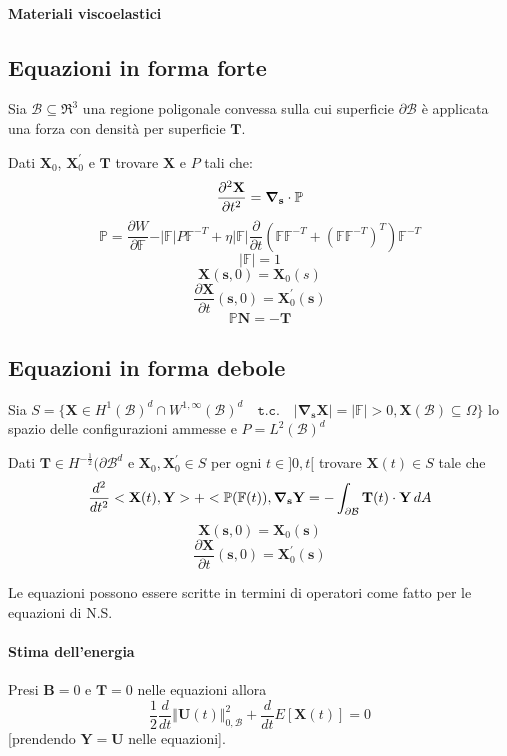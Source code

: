 \paragraph{Materiali viscoelastici}

\subsection{Equazioni in forma forte}

Sia $\mathcal{B} \subseteq \Re^3$ una regione poligonale convessa sulla cui superficie $\partial\mathcal{B}$ è applicata una forza con densità per superficie $\mathbf{T}$.

Dati $\mathbf{X}_0$, $\mathbf{X}^{'}_0$ e $\mathbf{T}$ trovare $\mathbf{X}$ e $P$ tali che:
$$\frac{\partial^2\mathbf{X}}{\partial t^2} = \boldsymbol{\nabla}_\mathbf{s} \cdot \mathbb{P}$$
$$\mathbb{P} = \frac{\partial W}{\partial\mathbb{F}} - \vert\mathbb{F}\vert P\mathbb{F}^{-T} + \eta\vert\mathbb{F}\vert \frac{\partial}{\partial t}(\mathbb{F}\mathbb{F}^{-T} + (\mathbb{F}\mathbb{F}^{-T})^T)\mathbb{F}^{-T}$$
$$\vert\mathbb{F}\vert=1$$
$$\mathbf{X}(\mathbf{s},0)=\mathbf{X}_0(s)$$
$$\frac{\partial \mathbf{X}}{\partial t}(\mathbf{s},0)=\mathbf{X}^{'}_0(\mathbf{s})$$
$$\mathbb{P}\mathbf{N}=-\mathbf{T}$$

\subsection{Equazioni in forma debole}

Sia $S = \{ \mathbf{X} \in H^1(\mathcal{B})^d \cap W^{1,\infty}(\mathcal{B})^d \quad \texttt{t.c.} \quad \vert \boldsymbol {\nabla}_{\mathbf{s}}\mathbf{X}\vert = \vert \mathbb{F} \vert > 0, \mathbf{X}(\mathcal{B}) \subseteq \Omega \}$ lo spazio delle configurazioni ammesse e $P = L^2(\mathcal{B})^d$

Dati $\mathbf{T} \in H^{-\frac{1}{2}}(\partial\mathcal{B}^d$ e $\mathbf{X}_0,\mathbf{X}^{'}_0 \in S$ per ogni $t \in ]0,t[$ trovare $\mathbf{X}(t) \in S$ tale che 
$$\frac{d^2}{dt^2} < \mathbf{X}(t), \mathbf{Y} > + < \mathbb{P}(\mathbb{F}(t)), \boldsymbol{\nabla}_\mathbf{s} \mathbf{Y} = -\int_{\partial\mathcal{B}}\mathbf{T}(t)\cdot\mathbf{Y}\,dA$$
$$\mathbf{X}(\mathbf{s},0)=\mathbf{X}_0(\mathbf{s})$$
$$\frac{\partial\mathbf{X}}{\partial t}(\mathbf{s},0)=\mathbf{X}^{'}_0(\mathbf{s})$$

Le equazioni possono essere scritte in termini di operatori come fatto per le equazioni di N.S.

\paragraph{Stima dell'energia}

Presi $\mathbf{B}=0$ e $\mathbf{T}=0$ nelle equazioni allora
$$\frac{1}{2}\frac{d}{dt}\Vert\mathbf{U}(t)\Vert^2_{0,\mathcal{B}}+\frac{d}{dt}E[\mathbf{X}(t)]=0$$
[prendendo $\mathbf{Y}=\mathbf{U}$ nelle equazioni].


